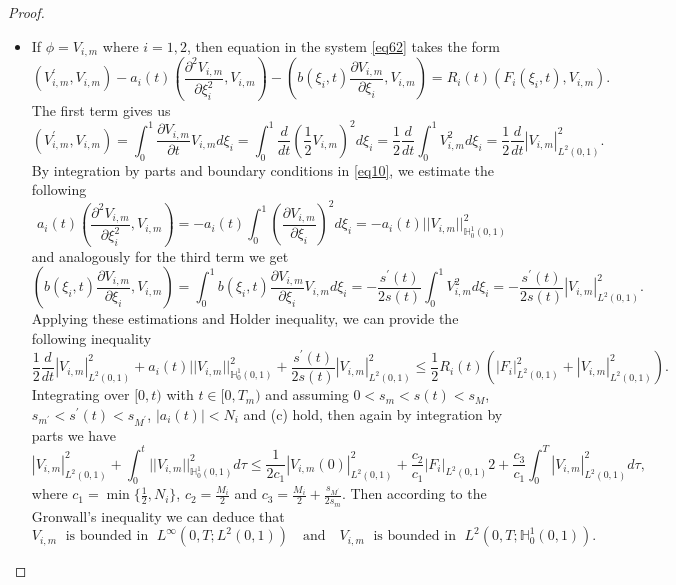 \documentclass[preprint,12pt,authoryear]{elsarticle}
\begin{document}
\begin{proof}
    \begin{itemize}
        \item [Case 1.] If $\phi=V_{i,m}$ where $i=1,2$, then equation in the system \eqref{eq62} takes the form
        $$\left(V_{i,m}^{\prime},V_{i,m}\right)-a_i(t)\left(\frac{\partial^2 V_{i,m}}{\partial \xi_i^2},V_{i,m}\right)-\left(b(\xi_i,t)\frac{\partial V_{i,m}}{\partial \xi_i},V_{i,m}\right)=R_i(t)\left(F_i(\xi_i,t),V_{i,m}\right).$$
        The first term gives us
        $$\left(V_{i,m}^{\prime},V_{i,m}\right)=\int_0^1\frac{\partial V_{i,m}}{\partial t}V_{i,m}d\xi_i=\int_0^1\frac{d}{dt}\left(\frac{1}{2}V_{i,m}\right)^2d\xi_i=\frac{1}{2}\frac{d}{dt}\int_0^1 V_{i,m}^2d\xi_i=\frac{1}{2}\frac{d}{dt}\left|V_{i,m}\right|_{L^2(0,1)}^2.$$
        By integration by parts and boundary conditions in \eqref{eq10}, we estimate the following
        $$a_i(t)\left(\frac{\partial^2 V_{i,m}}{\partial \xi_i^2},V_{i,m}\right)=-a_i(t)\int_0^1 \left(\frac{\partial V_{i,m}}{\partial \xi_i}\right)^2 d\xi_i=-a_i(t)||V_{i,m}||^2_{\mathbb{H}_0^1(0,1)}$$
        and analogously for the third term we get
        $$\left(b(\xi_i,t)\frac{\partial V_{i,m}}{\partial \xi_i},V_{i,m}\right)=\int_0^1 b(\xi_i,t)\frac{\partial V_{i,m}}{\partial \xi_i}V_{i,m}d\xi_i=-\frac{s^{\prime}(t)}{2s(t)}\int_0^1 V_{i,m}^2 d\xi_i=-\frac{s^{\prime}(t)}{2s(t)}\left|V_{i,m}\right|^2_{L^2(0,1)}.$$
        Applying these estimations and Holder inequality, we can provide the following inequality
        $$\frac{1}{2}\frac{d}{dt}|V_{i,m}|_{L^2(0,1)}^2+a_i(t)||V_{i,m}||_{\mathbb{H}_0^1(0,1)}^2+\frac{s^{\prime}(t)}{2s(t)}\left|V_{i,m}\right|^2_{L^2(0,1)}\leq \frac{1}{2}R_i(t)\left(|F_i|_{L^2(0,1)}^2+|V_{i,m}|_{L^2(0,1)}^2\right).$$
        Integrating over $[0,t)$ with $t\in[0,T_m)$ and assuming $0<s_m<s(t)<s_M$, $s_{m^{\prime}}<s^{\prime}(t)<s_{M^{\prime}}$, $|a_i(t)|<N_i$  and (c) hold, then again by integration by parts we have
        $$|V_{i,m}|_{L^2(0,1)}^2+\int_0^t ||V_{i,m}||_{\mathbb{H}_0^1(0,1)}^2d\tau\leq\frac{1}{2c_1}|V_{i,m}(0)|_{L^2(0,1)}^2+\frac{c_2}{c_1}|F_{i}|_{L^2(0,1)}2+\frac{c_3}{c_1}\int_0^T |V_{i,m}|_{L^2(0,1)}^2d\tau,$$
        where $c_1=\min\{\frac{1}{2}, N_i\}$, $c_2=\frac{M_i}{2}$ and $c_3=\frac{M_i}{2}+\frac{s_{M^{\prime}}}{2s_m}$. Then according to the Gronwall's inequality we can deduce that
        $$V_{i,m}\;\text{ is bounded in }\;L^{\infty}(0,T; L^2(0,1))\quad\text{and}\quad V_{i,m}\;\text{ is bounded in }\; L^2(0,T;\mathbb{H}_0^1(0,1)).$$


\end{itemize}
\end{proof}
\end{document}
